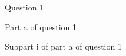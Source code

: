 \documentclass[a4paper,12pt]{article}
\begin{document}
    \maketitle
    \tableofcontents

    \begin{question}

        Question 1

        \qpart %

        Part a of question 1

        \qsubpart %

        Subpart i of part a of question 1

    \end{question}
\end{document}
